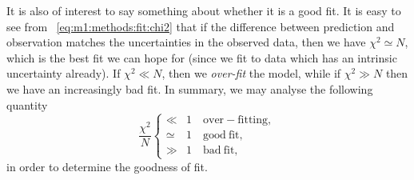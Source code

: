     It is also of interest to say something about whether it is a good fit. It is easy to see from ~\cref{eq:m1:methods:fit:chi2} that if the difference between prediction and observation matches the uncertainties in the observed data, then we have $\chi^2 \simeq N$, which is the best fit we can hope for (since we fit to data which has an intrinsic uncertainty already). If $\chi^2\ll N$, then we \textit{over-fit} the model, while if $\chi^2\gg N$ then we have an increasingly bad fit. In summary, we may analyse the following quantity
    \begin{equation}\label{eq:m1:fit:goodness_of_fit}
        \frac{\chi^2}{N} \begin{cases}
            \ll &1 \quad \mathrm{over-fitting,} \\
            \simeq &1 \quad \mathrm{good\ fit,}\\
            \gg &1 \quad \mathrm{bad\ fit,}
        \end{cases}
    \end{equation}
    in order to determine the goodness of fit. 


    